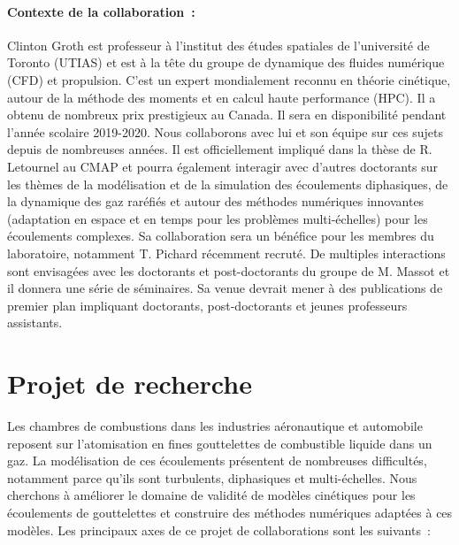 \documentclass[12pt]{article}
\begin{document}
\paragraph{Contexte de la collaboration~:} Clinton Groth est professeur à l'institut des études spatiales de l'université de Toronto (UTIAS) et est à la tête du groupe de dynamique des fluides numérique (CFD) et propulsion. C'est un expert mondialement reconnu en théorie cinétique, autour de la méthode des moments et en calcul haute performance (HPC). Il a obtenu de nombreux prix prestigieux au Canada. Il sera en disponibilité pendant l'année scolaire 2019-2020. Nous collaborons avec lui et son équipe sur ces sujets depuis de nombreuses années. Il est officiellement impliqué dans la thèse de R. Letournel au CMAP et pourra également interagir avec d'autres doctorants sur les thèmes de la modélisation et de la simulation des écoulements diphasiques, de la dynamique des gaz raréfiés et autour des méthodes numériques innovantes (adaptation en espace et en temps pour les problèmes multi-échelles) pour les écoulements complexes. Sa collaboration sera un bénéfice pour les membres du laboratoire, notamment T. Pichard récemment recruté. De multiples interactions sont envisagées avec les doctorants et post-doctorants du groupe de M. Massot et il donnera une série de séminaires. Sa venue devrait mener à des publications de premier plan impliquant doctorants, post-doctorants et jeunes professeurs assistants. 

\section*{Projet de recherche}
Les chambres de combustions dans les industries aéronautique et automobile reposent sur l'atomisation en fines gouttelettes de combustible liquide dans un gaz. La modélisation de ces écoulements présentent de nombreuses difficultés, notamment parce qu'ils sont turbulents, diphasiques et multi-échelles. Nous cherchons à améliorer le domaine de validité de modèles cinétiques pour les écoulements de gouttelettes et construire des méthodes numériques adaptées à ces modèles. Les principaux axes de ce projet de collaborations sont les suivants~:
\end{document}
